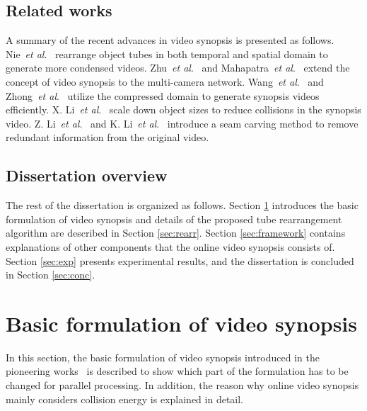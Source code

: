 \documentclass[11pt]{hyu_thesis}
\newcommand{\etal}{\textit{et al}.}
\begin{document}
\subsection{Related works}
\label{sec:intro:related}
A summary of the recent advances in video synopsis is presented as follows. Nie~\etal~\cite{Nie2014} rearrange object tubes in both temporal and spatial domain to generate more condensed videos. Zhu~\etal~\cite{Zhu2014} and Mahapatra~\etal~\cite{Mahapatra2016} extend the concept of video synopsis to the multi-camera network. Wang~\etal~\cite{Wang2013} and Zhong~\etal~\cite{RuiZhong2014} utilize the compressed domain to generate synopsis videos efficiently. X. Li~\etal~\cite{Li2016a} scale down object sizes to reduce collisions in the synopsis video. Z. Li~\etal~\cite{ZhuangLi2009} and K. Li~\etal~\cite{Li2016} introduce a seam carving method to remove redundant information from the original video.

\subsection{Dissertation overview}
\label{sec:intro:overview}
The rest of the dissertation is organized as follows. Section \ref{sec:basic_form} introduces the basic formulation of video synopsis and details of the proposed tube rearrangement algorithm are described in Section \ref{sec:rearr}. Section \ref{sec:framework} contains explanations of other components that the online video synopsis consists of. Section \ref{sec:exp} presents experimental results, and the dissertation is concluded in Section \ref{sec:conc}.

\section{Basic formulation of video synopsis}
\label{sec:basic_form}

In this section, the basic formulation of video synopsis introduced in the pioneering works~\cite{Rav-Acha2006,Pritch2007,Pritch2008} is described to show which part of the formulation has to be changed for parallel processing. In addition, the reason why online video synopsis mainly considers collision energy is explained in detail.
\end{document}

